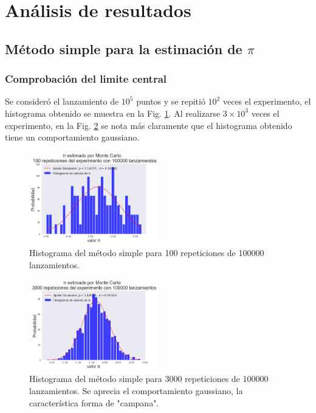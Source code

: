 \documentclass{rbf}
\begin{document}
\section{Análisis de resultados}
\subsection{Método simple para la estimación de $\pi$}
\subsubsection{Comprobación del limite central}

Se consideró el lanzamiento de $10^5$ puntos y se repitió $10^2$ veces el experimento, el histograma obtenido se muestra en la Fig. \ref{buff1}. Al realizarse $3 \times 10^3$ veces el experimento, en la Fig. \ref{buff2} se nota más claramente que el histograma obtenido tiene un comportamiento gaussiano.

\begin{figure}[h]
 \centering
  \includegraphics[width=0.5\textwidth]{figures/100rep.png}
	\caption{Histograma del método simple para 100 repeticiones de 100000 lanzamientos.}
 \label{buff1}
\end{figure}

\begin{figure}[tbp!]
 \centering
  \includegraphics[width=0.5\textwidth]{figures/3000rep1e5.png}
	\caption{Histograma del método simple para 3000 repeticiones de 100000 lanzamientos. Se aprecia el comportamiento gaussiano, la característica forma de "campana".}
 \label{buff2}
\end{figure}
\end{document}
